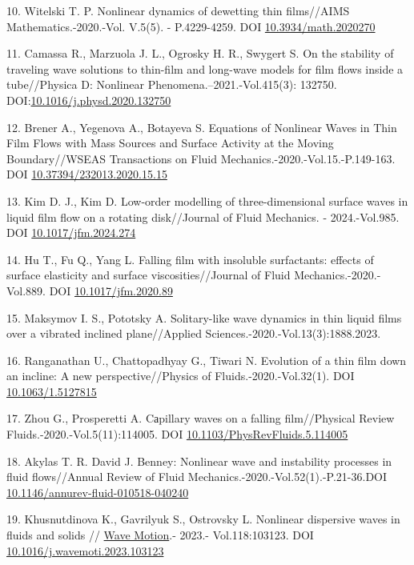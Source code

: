 \begin{references}
10. Witelski T. P. Nonlinear dynamics of dewetting thin films//AIMS
Mathematics.-2020.-Vol. V.5(5). - P.4229-4259. DOI
\href{http://dx.doi.org/10.3934/math.2020270}{10.3934/math.2020270}

11. Camassa R., Marzuola J. L., Ogrosky H. R., Swygert S. On the
stability of traveling wave solutions to thin-film and long-wave models
for film flows inside a tube//Physica D: Nonlinear
Phenomena.--2021.-Vol.415(3): 132750.
DOI:\href{http://dx.doi.org/10.1016/j.physd.2020.132750}{10.1016/j.physd.2020.132750}

12. Brener A., Yegenova A., Botayeva S. Equations of Nonlinear Waves in
Thin Film Flows with Mass Sources and Surface Activity at the Moving
Boundary//WSEAS Transactions on Fluid
Mechanics.-2020.-Vol.15.-P.149-163. DOI
\href{http://dx.doi.org/10.37394/232013.2020.15.15}{10.37394/232013.2020.15.15}

13. Kim D. J., Kim D. Low-order modelling of three-dimensional surface
waves in liquid film flow on a rotating disk//Journal of Fluid
Mechanics. - 2024.-Vol.985. DOI
\href{http://dx.doi.org/10.1017/jfm.2024.274}{10.1017/jfm.2024.274}

14. Hu T., Fu Q., Yang L. Falling film with insoluble surfactants:
effects of surface elasticity and surface viscosities//Journal of Fluid
Mechanics.-2020.-Vol.889. DOI
\href{http://dx.doi.org/10.1017/jfm.2020.89}{10.1017/jfm.2020.89}

15. Maksymov I. S., Pototsky A. Solitary-like wave dynamics in thin
liquid films over a vibrated inclined plane//Applied
Sciences.-2020.-Vol.13(3):1888.2023.
\href{https://doi.org/10.3390/app13031888}{}

16. Ranganathan U., Chattopadhyay G., Tiwari N. Evolution of a thin film
down an incline: A new perspective//Physics of Fluids.-2020.-Vol.32(1).
DOI \href{http://dx.doi.org/10.1063/1.5127815}{10.1063/1.5127815}

17. Zhou G., Prosperetti A. Cаpillary waves on a falling film//Physical
Review Fluids.-2020.-Vol.5(11):114005. DOI
\href{http://dx.doi.org/10.1103/PhysRevFluids.5.114005}{10.1103/PhysRevFluids.5.114005}

18. Akylas T. R. David J. Benney: Nonlinear wave and instability
processes in fluid flows//Annual Review of Fluid
Mechanics.-2020.-Vol.52(1).-P.21-36.DOI
\href{http://dx.doi.org/10.1146/annurev-fluid-010518-040240}{10.1146/annurev-fluid-010518-040240}

19. Khusnutdinova K., Gavrilyuk S., Ostrovsky L. Nonlinear dispersive
waves in fluids and solids //
\href{https://www.researchgate.net/journal/Wave-Motion-0165-2125?_tp=eyJjb250ZXh0Ijp7ImZpcnN0UGFnZSI6InB1YmxpY2F0aW9uIiwicGFnZSI6InB1YmxpY2F0aW9uIn19}{Wave
Motion}.- 2023.- Vol.118:103123. DOI
\href{http://dx.doi.org/10.1016/j.wavemoti.2023.103123}{10.1016/j.wavemoti.2023.103123}


\end{references}
